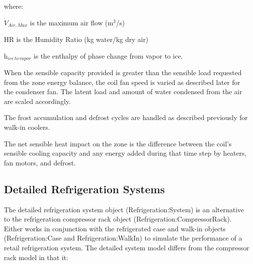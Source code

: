 where:

\({\dot V_{Air,Max}}\) is the maximum air flow (m\(^{3}\)/s)

HR is the Humidity Ratio (kg water/kg dry air)

h\(_{ice\, to\, vapor}\) is the enthalpy of phase change from vapor to ice.

When the sensible capacity provided is greater than the sensible load requested from the zone energy balance, the coil fan speed is varied as described later for the condenser fan. The latent load and amount of water condensed from the air are scaled accordingly.

The frost accumulation and defrost cycles are handled as described previously for walk-in coolers.

The net sensible heat impact on the zone is the difference between the coil's sensible cooling capacity and any energy added during that time step by heaters, fan motors, and defrost.

\subsection{Detailed Refrigeration Systems}\label{detailed-refrigeration-systems}

The detailed refrigeration system object (Refrigeration:System) is an alternative to the refrigeration compressor rack object (Refrigeration:CompressorRack). Either works in conjunction with the refrigerated case and walk-in objects (Refrigeration:Case and Refrigeration:WalkIn) to simulate the performance of a retail refrigeration system. The detailed system model differs from the compressor rack model in that it:


